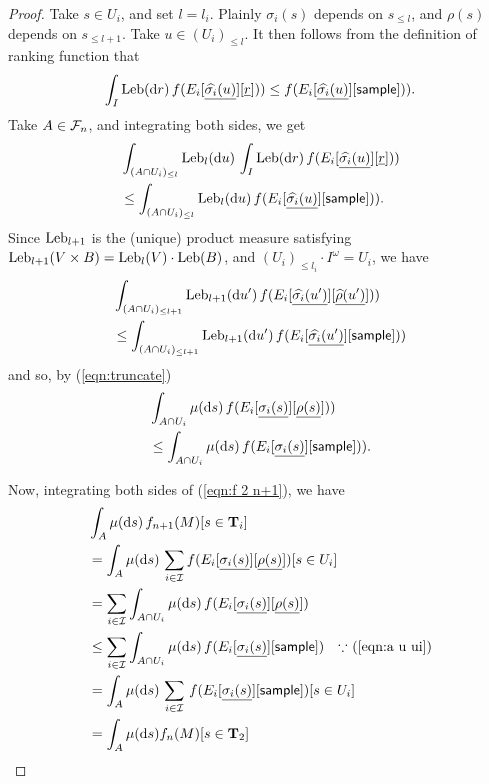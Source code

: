 \begin{proof}
Take $s \in U_i$, and set $l = l_i$.
Plainly $\sigma_i(s)$ depends on $s_{\leq l}$, and $\rho(s)$ depends on $s_{\leq l +1}$.
Take $u \in (U_i)_{\leq l}$.
It then follows from the definition of ranking function that
\[%
\int_I \Leb(\dif r) \, f(E_i[\underline{\widehat{\sigma_i}(u)}][\underline{r}])) \leq f(E_i[\underline{\widehat{\sigma_i}(u)}][\tsample])).
\]
Take $A \in \mathcal{F}_n$, and integrating both sides, we get
\begin{align*}
& \int_{(A \cap U_i)_{\leq l}} \mathrm{Leb}_l(\mathrm{d} u) \, \int_I \textrm{Leb}(\mathrm{d} r) \, f(E_i[\underline{\widehat{\sigma_i}(u)}][\underline{r}])) \\
& \leq \int_{(A \cap U_i)_{\leq l}} \mathrm{Leb}_l(\mathrm{d} u) \, f(E_i[\underline{\widehat{\sigma_i}(u)}][\mathsf{sample}])).
\end{align*}
Since $\mathrm{Leb}_{l+1}$ is the (unique) product measure satisfying $\mathrm{Leb}_{l+1}(V \times B) = \mathrm{Leb}_l(V) \cdot \mathrm{Leb}(B)$, and $(U_i)_{\leq l_i} \cdot I^\omega = U_i$, we have
\begin{align*}
& \int_{(A \cap U_i)_{\leq l+1}} \mathrm{Leb}_{l+1}(\mathrm{d} u') \, f(E_i[\underline{\widehat{\sigma_i}(u')}][\underline{\widehat{\rho}(u')}])) \\
& \leq 
\int_{(A \cap U_i)_{\leq l+1}} \mathrm{Leb}_{l+1}(\mathrm{d} u') \, f(E_i[\underline{\widehat{\sigma_i}(u')}][\mathsf{sample}]))
\end{align*}
and so, by (\ref{eqn:truncate})
\begin{align}
& \int_{A \cap U_i} \mu(\dif s) \, f(E_i[\underline{\sigma_i(s)}][\underline{\rho(s)}])) \nonumber \\
& \leq 
\int_{A \cap U_i} \mu(\dif s) \, f(E_i[\underline{\sigma_i(s)}][\tsample])).
\label{eqn:a u ui}
\end{align}

Now, integrating both sides of (\ref{eqn:f 2 n+1}), we have
\begin{align*}
& \int_A \mu(\mathrm{d} s) \, f_{n+1}(M)[s \in \mathbf{T}_i] \\
&= 
\int_A \mu(\mathrm{d} s) \, \sum_{i \in \mathcal{I}} f(E_i[\underline{\sigma_i(s)}][\underline{\rho(s)}])[s \in U_i] \\
&= 
\sum_{i \in \mathcal{I}} \int_{A \cap U_i} \mu(\mathrm{d} s) \, f(E_i[\underline{\sigma_i(s)}][\underline{\rho(s)}])\\
&\leq 
\sum_{i \in \mathcal{I}} \int_{A \cap U_i} \mu(\mathrm{d} s) \, f(E_i[\underline{\sigma_i(s)}][\mathsf{sample}])
\quad \hbox{$\because$ (\ref{eqn:a u ui})}\\
&= 
\int_{A} \mu(\mathrm{d} s) \, \sum_{i \in \mathcal{I}} \, f(E_i[\underline{\sigma_i(s)}][\mathsf{sample}])[s \in U_i]\\
&= \int_{A} \mu(\mathrm{d} s) f_{n}(M)[s \in \mathbf{T}_2]
\end{align*}

\end{proof}

